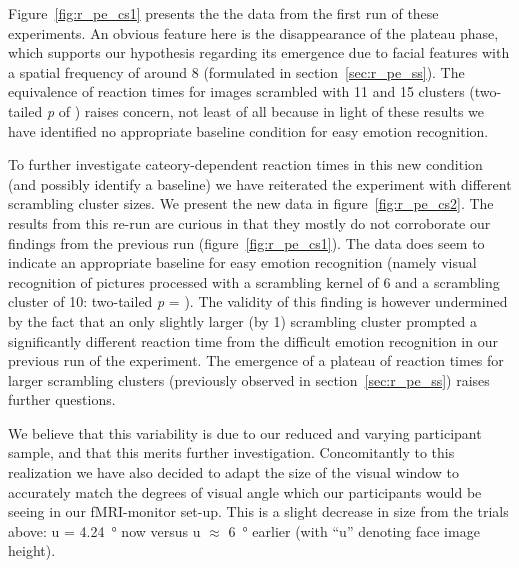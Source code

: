 	    Figure~\ref{fig:r_pe_cs1} presents the the data from the first run of these experiments.
	    An obvious feature here is the disappearance of the plateau phase, which supports our hypothesis regarding its emergence due to facial features with a spatial frequency of around \SI{8}{\pixel} (formulated in section~\ref{sec:r_pe_ss}).
	    The equivalence of reaction times for images scrambled with \SI{11}{\pixel} and \SI{15}{\pixel} clusters (two-tailed \textit{p} of ) raises concern, not least of all because in light of these results we have identified no appropriate baseline condition for easy emotion recognition.
	    
	    To further investigate cateory-dependent reaction times in this new condition (and possibly identify a baseline) we have reiterated the experiment with different scrambling cluster sizes.
	    We present the new data in figure~\ref{fig:r_pe_cs2}.
	    The results from this re-run are curious in that they mostly do not corroborate our findings from the previous run (figure~\ref{fig:r_pe_cs1}).
	    The data does seem to indicate an appropriate baseline for easy emotion recognition (namely visual recognition of pictures processed with a scrambling kernel of \SI{6}{\pixel} and a scrambling cluster of \SI{10}{\pixel}: two-tailed \textit{p} = ).
	    The validity of this finding is however undermined by the fact that an only slightly larger (by \SI{1}{\pixel}) scrambling cluster prompted a significantly different reaction time from the difficult emotion recognition in our previous run of the experiment.
	    The emergence of a plateau of reaction times for larger scrambling clusters (previously observed in section~\ref{sec:r_pe_ss}) raises further questions.
	    
	    We believe that this variability is due to our reduced and varying participant sample, and that this merits further investigation.
	    Concomitantly to this realization we have also decided to adapt the size of the visual window to accurately match the degrees of visual angle which our participants would be seeing in our fMRI-monitor set-up. This is a slight decrease in size from the trials above: u = \SI{4.24}{\degree} now versus u $\approx$ \SI{6}{\degree} earlier (with “u” denoting face image height).
	    
